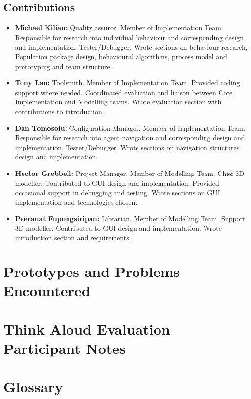 \documentclass{l3proj}
\begin{document}
\section{Contributions}
\label{contributions}

\begin{itemize}
\item{\textbf{Michael Kilian:} Quality assuror. Member of Implementation Team. Responsible for research into individual behaviour and corresponding design and implementation. Tester/Debugger. Wrote sections on behaviour research, Population package design, behavioural algorithms, process model and prototyping and team structure.}
\item{\textbf{Tony Lau:} Toolsmith. Member of Implementation Team. Provided coding support where needed. Coordinated evaluation and liaison between Core Implementation and Modelling teams. Wrote evaluation section with contributions to introduction. }
\item{\textbf{Dan Tomosoiu:} Configuration Manager. Member of Implementation Team. Responsible for research into agent navigation and corresponding design and implementation. Tester/Debugger. Wrote sections on navigation structures design and implementation.}
\item{\textbf{Hector Grebbell:} Project Manager. Member of Modelling Team. Chief 3D modeller. Contributed to GUI design and implementation. Provided occasional support in debugging and testing. Wrote sections on GUI implementation and technologies chosen.}
\item{\textbf{Peeranat Fupongsiripan:} Librarian. Member of Modelling Team. Support 3D modeller. Contributed to GUI design and implementation. Wrote introduction section and requirements. }
\end{itemize}

\clearpage
\appendix
{}


\chapter{Prototypes and Problems Encountered}


\chapter{Think Aloud Evaluation Participant Notes}



\chapter{Glossary}









\end{document}
